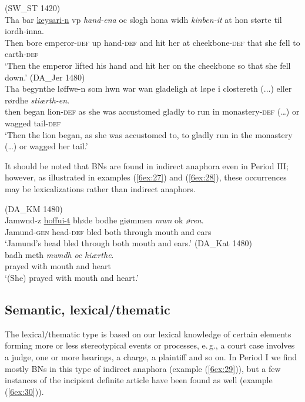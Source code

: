 \documentclass[output=paper]{langsci/langscibook}
\begin{document}
\begin{exe}
\ex\label{6ex:25}
(SW\_ST 1420)\\
\gll Tha bar {\ul{keysari-n}} vp {\emph{hand-ena}} oc slogh hona widh {\emph{kinben-it}} at hon størte til iordh-inna. \\
Then bore emperor-{\textsc{def}} up hand-{\textsc{def}} and hit her at cheekbone-{\textsc{def}} that she fell to earth-{\textsc{def}} \\
\glt `Then the emperor lifted his hand and hit her on the cheekbone so that she fell down.'
\ex\label{6ex:26}
(DA\_Jer 1480) \\
\gll Tha begynthe løffwe-n som hwn war wan gladeligh at løpe i clostereth (...) eller rørdhe {\emph{stiærth-en}}. \\
then began lion-{\textsc{def}} as she was accustomed gladly to run in monastery-{\textsc{def}} (…) or wagged tail-{\textsc{def}}  \\
\glt `Then the lion began, as she was accustomed to, to gladly run in the monastery (…) or wagged her tail.'
\end{exe}

It should be noted that BNs are found in indirect anaphora even in Period III; however, as illustrated in examples (\ref{6ex:27}) and (\ref{6ex:28}), these occurrences may be lexicalizations rather than indirect anaphors. 

\begin{exe}
\ex\label{6ex:27}
(DA\_KM 1480)\\
\gll Jamwnd-z {\ul{hoffui-t}} bløde bodhe giømmen {\emph{mwn}} ok {\emph{øren}}.  \\
Jamund-{\textsc{gen}} head-{\textsc{def}} bled both through mouth and ears \\
\glt `Jamund's head bled through both mouth and ears.' 
\ex\label{6ex:28}
(DA\_Kat 1480)\\

\gll badh meth {\emph{mwndh}} {\emph{oc}} {\emph{hiærthe}}. \\
prayed with mouth and heart \\
\glt `(She) prayed with mouth and heart.' 
\end{exe}

\subsection{Semantic, lexical/thematic}\label{6sec:42}
\largerpage
The lexical/thematic type is based on our lexical knowledge of certain elements forming more or less stereotypical events or processes, e.\,g., a court case involves a judge, one or more hearings, a charge, a plaintiff and so on. In Period I we find mostly BNs in this type of indirect anaphora (example (\ref{6ex:29})), but a few instances of the incipient definite article have been found as well (example (\ref{6ex:30})). 
\end{document}
